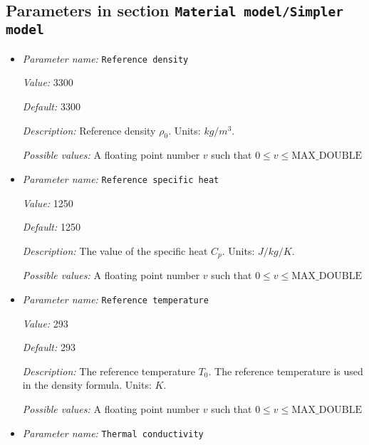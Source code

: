 \subsection{Parameters in section \tt Material model/Simpler model}
\label{parameters:Material_20model/Simpler_20model}

\begin{itemize}
\item {\it Parameter name:} {\tt Reference density}
\label{parameters:Material model/Simpler model/Reference density}


{\it Value:} 3300


{\it Default:} 3300


{\it Description:} Reference density $\rho_0$. Units: $kg/m^3$.


{\it Possible values:} A floating point number $v$ such that $0 \leq v \leq \text{MAX\_DOUBLE}$
\item {\it Parameter name:} {\tt Reference specific heat}
\label{parameters:Material model/Simpler model/Reference specific heat}


{\it Value:} 1250


{\it Default:} 1250


{\it Description:} The value of the specific heat $C_p$. Units: $J/kg/K$.


{\it Possible values:} A floating point number $v$ such that $0 \leq v \leq \text{MAX\_DOUBLE}$
\item {\it Parameter name:} {\tt Reference temperature}
\label{parameters:Material model/Simpler model/Reference temperature}


{\it Value:} 293


{\it Default:} 293


{\it Description:} The reference temperature $T_0$. The reference temperature is used in the density formula. Units: $K$.


{\it Possible values:} A floating point number $v$ such that $0 \leq v \leq \text{MAX\_DOUBLE}$
\item {\it Parameter name:} {\tt Thermal conductivity}
\label{parameters:Material model/Simpler model/Thermal conductivity}



\end{itemize}
